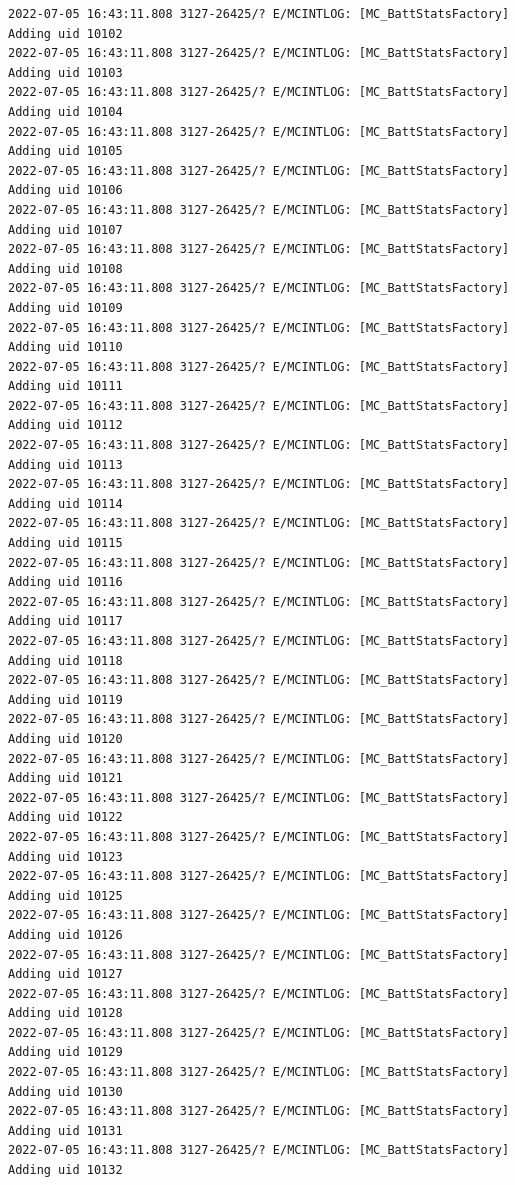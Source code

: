 \documentclass[a4paper,12pt]{book}
\begin{document}
\begin{lstlisting}
2022-07-05 16:43:11.808 3127-26425/? E/MCINTLOG: [MC_BattStatsFactory] Adding uid 10102
2022-07-05 16:43:11.808 3127-26425/? E/MCINTLOG: [MC_BattStatsFactory] Adding uid 10103
2022-07-05 16:43:11.808 3127-26425/? E/MCINTLOG: [MC_BattStatsFactory] Adding uid 10104
2022-07-05 16:43:11.808 3127-26425/? E/MCINTLOG: [MC_BattStatsFactory] Adding uid 10105
2022-07-05 16:43:11.808 3127-26425/? E/MCINTLOG: [MC_BattStatsFactory] Adding uid 10106
2022-07-05 16:43:11.808 3127-26425/? E/MCINTLOG: [MC_BattStatsFactory] Adding uid 10107
2022-07-05 16:43:11.808 3127-26425/? E/MCINTLOG: [MC_BattStatsFactory] Adding uid 10108
2022-07-05 16:43:11.808 3127-26425/? E/MCINTLOG: [MC_BattStatsFactory] Adding uid 10109
2022-07-05 16:43:11.808 3127-26425/? E/MCINTLOG: [MC_BattStatsFactory] Adding uid 10110
2022-07-05 16:43:11.808 3127-26425/? E/MCINTLOG: [MC_BattStatsFactory] Adding uid 10111
2022-07-05 16:43:11.808 3127-26425/? E/MCINTLOG: [MC_BattStatsFactory] Adding uid 10112
2022-07-05 16:43:11.808 3127-26425/? E/MCINTLOG: [MC_BattStatsFactory] Adding uid 10113
2022-07-05 16:43:11.808 3127-26425/? E/MCINTLOG: [MC_BattStatsFactory] Adding uid 10114
2022-07-05 16:43:11.808 3127-26425/? E/MCINTLOG: [MC_BattStatsFactory] Adding uid 10115
2022-07-05 16:43:11.808 3127-26425/? E/MCINTLOG: [MC_BattStatsFactory] Adding uid 10116
2022-07-05 16:43:11.808 3127-26425/? E/MCINTLOG: [MC_BattStatsFactory] Adding uid 10117
2022-07-05 16:43:11.808 3127-26425/? E/MCINTLOG: [MC_BattStatsFactory] Adding uid 10118
2022-07-05 16:43:11.808 3127-26425/? E/MCINTLOG: [MC_BattStatsFactory] Adding uid 10119
2022-07-05 16:43:11.808 3127-26425/? E/MCINTLOG: [MC_BattStatsFactory] Adding uid 10120
2022-07-05 16:43:11.808 3127-26425/? E/MCINTLOG: [MC_BattStatsFactory] Adding uid 10121
2022-07-05 16:43:11.808 3127-26425/? E/MCINTLOG: [MC_BattStatsFactory] Adding uid 10122
2022-07-05 16:43:11.808 3127-26425/? E/MCINTLOG: [MC_BattStatsFactory] Adding uid 10123
2022-07-05 16:43:11.808 3127-26425/? E/MCINTLOG: [MC_BattStatsFactory] Adding uid 10125
2022-07-05 16:43:11.808 3127-26425/? E/MCINTLOG: [MC_BattStatsFactory] Adding uid 10126
2022-07-05 16:43:11.808 3127-26425/? E/MCINTLOG: [MC_BattStatsFactory] Adding uid 10127
2022-07-05 16:43:11.808 3127-26425/? E/MCINTLOG: [MC_BattStatsFactory] Adding uid 10128
2022-07-05 16:43:11.808 3127-26425/? E/MCINTLOG: [MC_BattStatsFactory] Adding uid 10129
2022-07-05 16:43:11.808 3127-26425/? E/MCINTLOG: [MC_BattStatsFactory] Adding uid 10130
2022-07-05 16:43:11.808 3127-26425/? E/MCINTLOG: [MC_BattStatsFactory] Adding uid 10131
2022-07-05 16:43:11.808 3127-26425/? E/MCINTLOG: [MC_BattStatsFactory] Adding uid 10132

\end{lstlisting}
\end{document}
